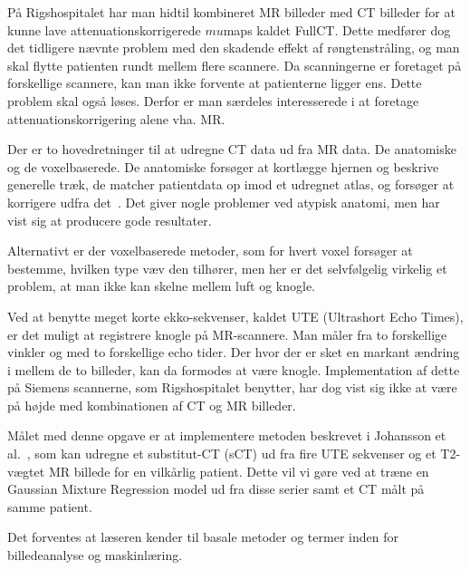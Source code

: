 På Rigshospitalet har man hidtil kombineret MR billeder med CT billeder
for at kunne lave attenuationskorrigerede $mu$maps kaldet FullCT.
Dette medfører dog det tidligere nævnte problem med den skadende
effekt af røngtenstråling, og man skal flytte patienten rundt mellem
flere scannere. Da scanningerne er foretaget på forskellige scannere,
kan man ikke forvente at patienterne ligger ens. Dette problem skal
også løses. Derfor er man særdeles interesserede i at foretage
attenuationskorrigering alene vha. MR.

Der er to hovedretninger til at udregne CT data ud fra MR data. De
anatomiske og de voxelbaserede. De anatomiske forsøger at kortlægge
hjernen og beskrive generelle træk, de matcher patientdata op imod
et udregnet atlas, og forsøger at korrigere udfra det~\cite{atlas1,
atlas2}. Det giver nogle problemer ved atypisk anatomi, men har vist sig
at producere gode resultater.

Alternativt er der voxelbaserede metoder, som for hvert voxel forsøger
at bestemme, hvilken type væv den tilhører, men her er det selvfølgelig
virkelig et problem, at man ikke kan skelne mellem luft og knogle.

Ved at benytte meget korte ekko-sekvenser, kaldet UTE (Ultrashort Echo
Times), er det muligt at registrere knogle på MR-scannere. Man måler fra
to forskellige vinkler og med to forskellige echo tider. Der hvor der er
sket en markant ændring i mellem de to billeder, kan da formodes at være
knogle. Implementation af dette på Siemens scannerne, som Rigshospitalet
benytter, har dog vist sig ikke at være på højde med kombinationen af
CT og MR billeder.

Målet med denne opgave er at implementere metoden beskrevet i
Johansson et al.~\cite{johansson}, som kan udregne et substitut-CT (sCT)
ud fra fire UTE sekvenser og et T2-vægtet MR billede for en vilkårlig
patient. Dette vil vi gøre ved at træne en Gaussian Mixture Regression
model ud fra disse serier samt et CT målt på samme patient.

Det forventes at læseren kender til basale metoder og termer inden for
billedeanalyse og maskinlæring.
